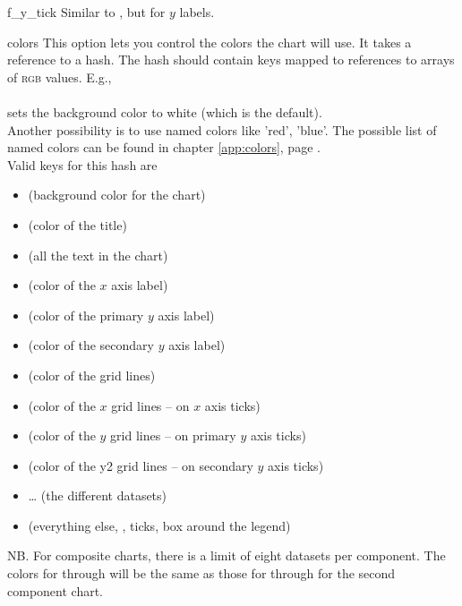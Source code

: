 \begin{AttrDecl}{f\_y\_tick}
Similar to , but for $y$ labels.
\end{AttrDecl}

\begin{AttrDecl}{colors}
\label{colors}
This option lets you control the colors the chart will use. It takes a
reference to a hash. The hash should contain keys mapped to references
to arrays of \textsc{rgb} values. E.g.,\\
\\
sets the background color to white (which is the default).\\
Another possibility is to use named colors like 'red', 'blue'. The possible
list of named colors can be found in chapter \ref{app:colors}, page \pageref{app:colors}.\\ 
Valid keys for this hash are
\begin{itemize}
\item {} (background color for the chart)
\item {} (color of the title)
\item {} (all the text in the chart)
\item {} (color of the $x$ axis label)
\item {} (color of the primary $y$ axis label)
\item {} (color of the secondary $y$ axis label)
\item {} (color of the grid lines)
\item {} (color of the $x$ grid lines -- on $x$ axis ticks)
\item {} (color of the $y$ grid lines -- on primary $y$ axis ticks)
\item {} (color of the y2 grid lines -- on secondary $y$ axis ticks)
\item {} \ldots {} (the different datasets)
\item {} (everything else, \eg, ticks, box around the legend)
\end{itemize}

NB. For composite charts, there is a limit of eight datasets per
component. The colors for  through 
will be the same as those for  through
 for the second component chart.
\end{AttrDecl}

